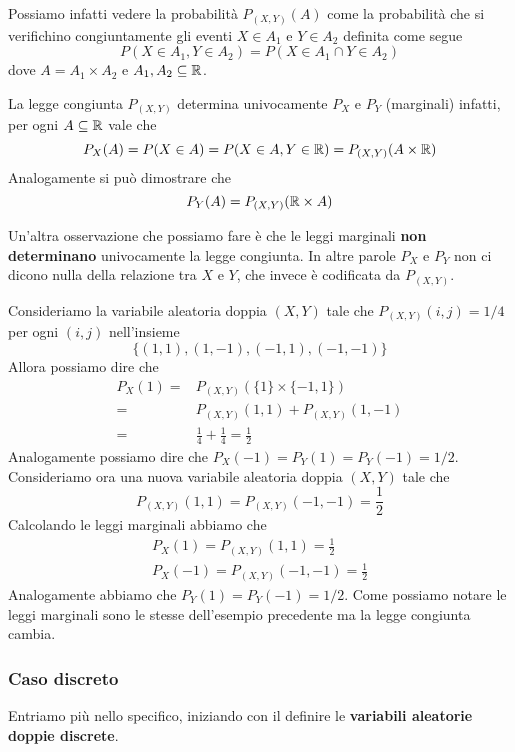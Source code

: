 Possiamo infatti vedere la probabilità $P_{(X,Y)} (A)$ come la probabilità che si verifichino
congiuntamente gli eventi $X \in A_1$ e $Y \in A_2$ definita come segue
\[ P(X \in A_1, Y \in A_2) = P(X \in A_1 \cap Y \in A_2) \]
dove $A = A_1 \times A_2$ e $A_1, A_2 \subseteq \mathbb{R}$.

\begin{observation}
	La legge congiunta $P_{(X,Y)}$ determina univocamente $P_X$ e $P_Y$ (marginali) infatti, per
	ogni $A \subseteq \mathbb{R}$ vale che
	\[ P_X(A) = P(X \in A) = P(X \in A, Y \in \mathbb{R}) = P_{(X,Y)} (A \times \mathbb{R}) \]
	Analogamente si può dimostrare che
	\[ P_Y(A) = P_{(X,Y)} (\mathbb{R} \times A) \]
\end{observation}

Un'altra osservazione che possiamo fare è che le leggi marginali \textbf{non determinano}
univocamente la legge congiunta. In altre parole $P_X$ e $P_Y$ non ci dicono nulla della relazione
tra $X$ e $Y$, che invece è codificata da $P_{(X,Y)}$.

\begin{example}
	Consideriamo la variabile aleatoria doppia $(X, Y)$ tale che $P_{(X, Y)} (i,j) = 1 / 4$ per
	ogni $(i,j)$ nell'insieme
	\[ \{ (1,1), (1,-1), (-1,1), (-1,-1) \} \]
	Allora possiamo dire che
	\begin{align*}
		P_X(1) = & P_{(X, Y)} (\{ 1 \} \times \{-1, 1\})   \\
		=        & P_{(X,Y)} (1,1) + P_{(X,Y)} (1,-1)      \\
		=        & \frac{1}{4} + \frac{1}{4} = \frac{1}{2}
	\end{align*}
	Analogamente possiamo dire che $P_X(-1) = P_Y(1) = P_Y(-1) = 1/2$. Consideriamo ora una nuova
	variabile aleatoria doppia $(X, Y)$ tale che
	\[ P_{(X,Y)} (1,1) = P_{(X, Y)} (-1, -1) = \frac{1}{2} \]
	Calcolando le leggi marginali abbiamo che
	\begin{gather*}
		P_X (1) = P_{(X, Y)} (1, 1) = \frac{1}{2} \\
		P_X (-1) = P_{(X, Y)} (-1, -1) = \frac{1}{2}
	\end{gather*}
	Analogamente abbiamo che $P_Y(1) = P_Y(-1) = 1/2$. Come possiamo notare le leggi marginali sono
	le stesse dell'esempio precedente ma la legge congiunta cambia.
\end{example}

\subsubsection{Caso discreto}
Entriamo più nello specifico, iniziando con il definire le
\textbf{variabili aleatorie doppie discrete}.

